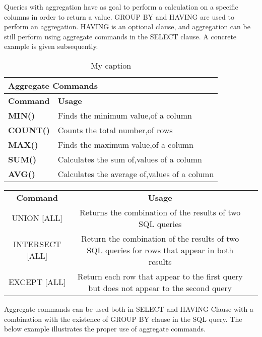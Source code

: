 Queries with aggregation have as goal to perform a calculation on a specific columns in order to return a value. GROUP BY and HAVING are used to perform an aggregation. HAVING is an optional clause, and aggregation can be still perform using aggregate commands in the SELECT clause. A concrete example is given subsequently. 

\begin{table}[h]
\centering
\caption{My caption}
\label{my-label}
\begin{tabular}{|l|l|}
\hline
\multicolumn{2}{|l|}{\textbf{Aggregate Commands}}                                                             \\ \hline
\textbf{Command}                        & \textbf{Usage}                                                      \\ \hline
{\color[HTML]{333333} \textbf{MIN()}}   & {\color[HTML]{333333} Finds the minimum value,of a column}          \\ \hline
{\color[HTML]{333333} \textbf{COUNT()}} & {\color[HTML]{333333} Counts the total number,of rows}              \\ \hline
{\color[HTML]{333333} \textbf{MAX()}}   & {\color[HTML]{333333} Finds the maximum value,of a column}          \\ \hline
{\color[HTML]{333333} \textbf{SUM()}}   & {\color[HTML]{333333} Calculates the sum of,values of a column}     \\ \hline
{\color[HTML]{333333} \textbf{AVG()}}   & {\color[HTML]{333333} Calculates the average of,values of a column} \\ \hline
\end{tabular}
\end{table}


\begin{tabular}{c:cc}
   \textbf{Command} & \textbf{Usage}  \\ 
   UNION [ALL] & Returns the combination of the results of two SQL 	  queries \\ 
   INTERSECT [ALL] & Return the combination of the results of two 	 SQL queries for rows that appear in both results   \\ 
   EXCEPT [ALL] & Return each row that appear to the first query 	but does not appear to the second query  \\
   \hline
\end{tabular}

 


Aggregate commands can be used both in SELECT and HAVING Clause with a combination with the existence of GROUP BY clause in the SQL query. The below example illustrates the proper use of aggregate commands.


